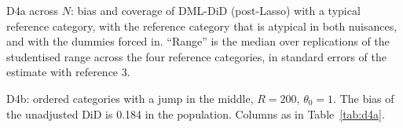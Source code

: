 \documentclass[11pt]{article}
\newenvironment{ins}{\begin{leftbar}}{\end{leftbar}}
\theoremstyle{plain}
\theoremstyle{remark}
\begin{document}
\begin{ins}

\end{ins}
\begin{table}[ht]
\centering\small

\caption{D4a across $N$: bias and coverage of DML-DiD (post-Lasso) with a typical
reference category, with the reference category that is atypical in both
nuisances, and with the dummies forced in. ``Range'' is the median over
replications of the studentised range across the four reference categories,
in standard errors of the estimate with reference 3.}
\label{tab:d4aN}
\end{table}
\begin{ins}

\end{ins}
\begin{table}[ht]
\centering\footnotesize
\setlength{\tabcolsep}{3.5pt}

\caption{D4b: ordered categories with a jump in the middle, $R=200$,
$\theta_0=1$. The bias of the unadjusted DiD is 0.184 in the population. Columns
as in Table~\ref{tab:d4a}.}
\label{tab:d4b}
\end{table}
\end{document}
